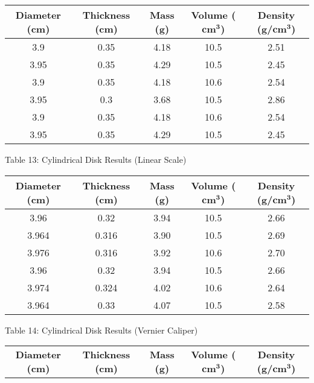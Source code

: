 \begin{center}
\begin{center}
    \begin{tabular}{|c|c|c|c|c|}
        \hline
        \textbf{Diameter (cm)} & \textbf{Thickness (cm)} & \textbf{Mass (g)} & \textbf{Volume ($\bm{\textbf{cm}^3}$)} & \textbf{Density (g/$\bm{\textbf{cm}^3}$)}  \\
        \hline
        3.9 & 0.35 & 4.18 & 10.5 & 2.51 \\ \hline
        3.95 & 0.35 & 4.29 & 10.5 & 2.45 \\ \hline
        3.9 & 0.35 & 4.18 & 10.6 & 2.54 \\ \hline
        3.95 & 0.3 & 3.68 & 10.5 & 2.86 \\ \hline
        3.9 & 0.35 & 4.18 & 10.6 & 2.54 \\ \hline
        3.95 & 0.35 & 4.29 & 10.5 & 2.45 \\ \hline
    \end{tabular}
\end{center}
\vspace{3 mm}
Table 13: Cylindrical Disk Results (Linear Scale)
\begin{center}
    \begin{tabular}{|c|c|c|c|c|}
        \hline
        \textbf{Diameter (cm)} & \textbf{Thickness (cm)} & \textbf{Mass (g)} & \textbf{Volume ($\bm{\textbf{cm}^3}$)} & \textbf{Density (g/$\bm{\textbf{cm}^3}$)}  \\
        \hline
        3.96 & 0.32 & 3.94 & 10.5 & 2.66 \\ \hline
        3.964 & 0.316 & 3.90 & 10.5 & 2.69 \\ \hline
        3.976 & 0.316 & 3.92 & 10.6 & 2.70 \\ \hline
        3.96 & 0.32 & 3.94 & 10.5 & 2.66 \\ \hline
        3.974 & 0.324 & 4.02 & 10.6 & 2.64 \\ \hline
        3.964 & 0.33 & 4.07 & 10.5 & 2.58 \\ \hline
    \end{tabular}
\end{center}
Table 14: Cylindrical Disk Results (Vernier Caliper)
\begin{center}
    \begin{tabular}{|c|c|c|c|c|}
        \hline
        \textbf{Diameter (cm)} & \textbf{Thickness (cm)} & \textbf{Mass (g)} & \textbf{Volume ($\bm{\textbf{cm}^3}$)} & \textbf{Density (g/$\bm{\textbf{cm}^3}$)}  \\

\end{tabular}
\end{center}
\end{center}
